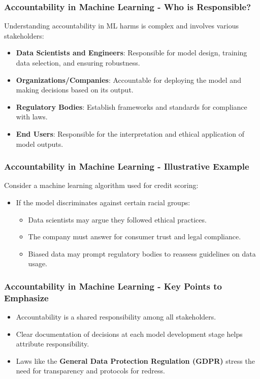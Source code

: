 \documentclass[aspectratio=169]{beamer}
\begin{document}
\begin{frame}[fragile]
    \frametitle{Accountability in Machine Learning - Who is Responsible?}
    Understanding accountability in ML harms is complex and involves various stakeholders:
    
    \begin{itemize}
        \item \textbf{Data Scientists and Engineers}: Responsible for model design, training data selection, and ensuring robustness.
        \item \textbf{Organizations/Companies}: Accountable for deploying the model and making decisions based on its output.
        \item \textbf{Regulatory Bodies}: Establish frameworks and standards for compliance with laws.
        \item \textbf{End Users}: Responsible for the interpretation and ethical application of model outputs.
    \end{itemize}
\end{frame}

\begin{frame}[fragile]
    \frametitle{Accountability in Machine Learning - Illustrative Example}
    Consider a machine learning algorithm used for credit scoring:
    
    \begin{itemize}
        \item If the model discriminates against certain racial groups:
            \begin{itemize}
                \item Data scientists may argue they followed ethical practices.
                \item The company must answer for consumer trust and legal compliance.
                \item Biased data may prompt regulatory bodies to reassess guidelines on data usage.
            \end{itemize}
    \end{itemize}
\end{frame}

\begin{frame}[fragile]
    \frametitle{Accountability in Machine Learning - Key Points to Emphasize}
    \begin{itemize}
        \item Accountability is a shared responsibility among all stakeholders.
        \item Clear documentation of decisions at each model development stage helps attribute responsibility.
        \item Laws like the \textbf{General Data Protection Regulation (GDPR)} stress the need for transparency and protocols for redress.
    \end{itemize}
\end{frame}
\end{document}
